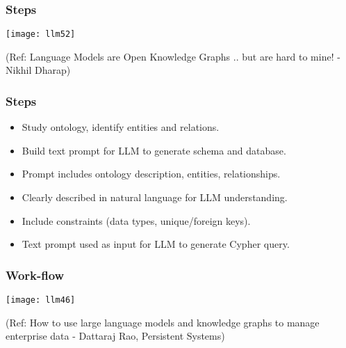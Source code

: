\begin{frame}[fragile]\frametitle{Steps}

\begin{center}
\texttt{[image: llm52]}
\end{center}	

{\tiny (Ref: Language Models are Open Knowledge Graphs .. but are hard to mine! - Nikhil Dharap)}
\end{frame}



\begin{frame}[fragile]\frametitle{Steps}

\begin{itemize}
\item Study ontology, identify entities and relations.
\item Build text prompt for LLM to generate schema and database.
\item Prompt includes ontology description, entities, relationships.
\item Clearly described in natural language for LLM understanding.
\item Include constraints (data types, unique/foreign keys).
\item Text prompt used as input for LLM to generate Cypher query.\end{itemize}
\end{frame}



\begin{frame}[fragile]\frametitle{Work-flow}

\begin{center}
\texttt{[image: llm46]}

{\tiny (Ref: How to use large language models and knowledge graphs to manage enterprise data - Dattaraj Rao, Persistent Systems)}
\end{center}
\end{frame}


